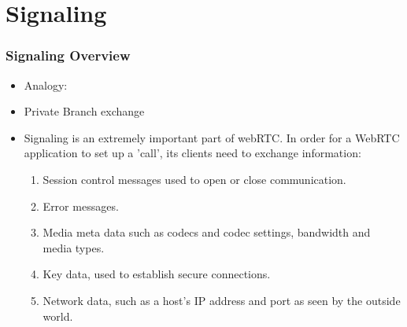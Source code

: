 \section{Signaling}
\begin{frame}[fragile]\frametitle{Signaling Overview}
\begin{itemize}
 
\item Analogy:
\item Private Branch exchange

\item Signaling is an extremely important part of webRTC. In order for a WebRTC application to set up a 'call', its clients need to exchange information:
  \begin{enumerate}
  \item Session control messages used to open or close communication.
  \item Error messages.
  \item Media meta data such as codecs and codec settings, bandwidth and media types.
  \item Key data, used to establish secure connections.
  \item Network data, such as a host's IP address and port as seen by the outside world.
  \end{enumerate}
\end{itemize}
\end{frame}
\clearpage

